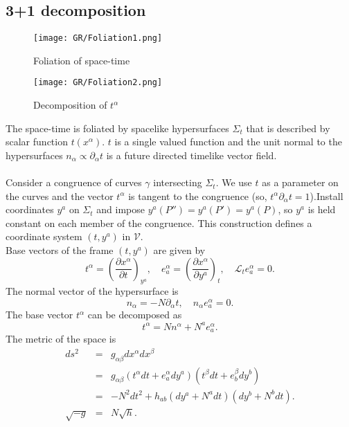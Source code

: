 \subsection{3+1 decomposition}
\begin{figure}[!h]
\begin{minipage}[t]{0.5\linewidth}
\centering
\texttt{[image: GR/Foliation1.png]}
\caption{Foliation of space-time}
\label{fig:side:a}
\end{minipage}%
\begin{minipage}[t]{0.5\linewidth}
\centering
\texttt{[image: GR/Foliation2.png]}
\caption{Decomposition of $t^{\alpha}$}
\label{fig:side:b}
\end{minipage}
\end{figure}
\noindent
The space-time is foliated by spacelike hypersurfaces $\Sigma_t$ that is described by scalar function $t(x^{\alpha})$. $t$ is a single valued function and the unit normal to the hypersurfaces $n_{\alpha} \propto \partial_{\alpha} t$ is a future directed timelike vector field.
\\ \\
Consider a congruence of curves $\gamma$ intersecting $\Sigma_t$. We use $t$ as a parameter on the curves and the vector $t^{\alpha}$ is tangent to the congruence (so, $t^{\alpha} \partial_{\alpha}t = 1$).Install coordinates $y^a$ on $\Sigma_t$ and impose $y^a(P'') = y^a(P') = y^a(P)$, so $y^a$ is held constant on each member of the congruence. This construction defines a coordinate system $(t,y^a)$ in $\mathcal{V}$.\\
Base vectors of the frame $(t, y^a)$ are given by
\[t^{\alpha} = \left( \frac{\partial x^{\alpha}}{\partial t}\right)_{y^a}, \quad e_a^{\alpha} = \left(\frac{\partial x^{\alpha}}{\partial y^a} \right)_t, \quad \mathscr{L}_t e_a^{\alpha} = 0.\]
The normal vector of the hypersurface is
\[n_{\alpha} = -N \partial_{\alpha}t, \quad n_{\alpha} e_a^{\alpha} = 0.\]
The base vector $t^{\alpha}$ can be decomposed as
\[t^{\alpha} = N n^{\alpha} + N^a e_a^{\alpha}.\]
The metric of the space is
\begin{eqnarray}
ds^2 &=& g_{\alpha \beta} dx^{\alpha} dx^{\beta} \nonumber \\
&=& g_{\alpha \beta} (t^{\alpha} dt + e_a^{\alpha}dy^a) (t^{\beta} dt + e_b^{\beta}dy^{b}) \nonumber \\
&=& -N^2 dt^2 + h_{ab}(dy^a+N^a dt)(dy^b + N^b dt). \nonumber \\
\sqrt{-g} &=& N \sqrt{h}. \nonumber
\end{eqnarray}

